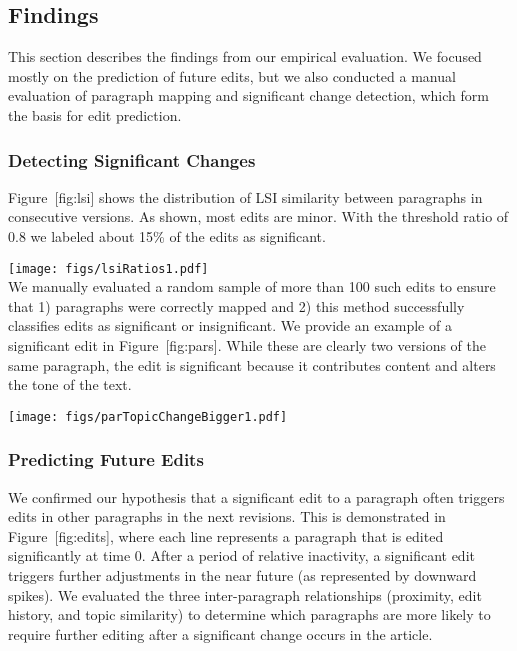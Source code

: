 \subsection{Findings}\label{findings}

This section describes the findings from our empirical evaluation. We
focused mostly on the prediction of future edits, but we also conducted
a manual evaluation of paragraph mapping and significant change
detection, which form the basis for edit prediction.

\subsubsection{Detecting Significant
Changes}\label{detecting-significant-changes}

Figure~{[}fig:lsi{]} shows the distribution of LSI similarity between
paragraphs in consecutive versions. As shown, most edits are minor. With
the threshold ratio of 0.8 we labeled about 15\% of the edits as
significant.

\texttt{[image: figs/lsiRatios1.pdf]}\\

We manually evaluated a random sample of more than 100 such edits to
ensure that 1) paragraphs were correctly mapped and 2) this method
successfully classifies edits as significant or insignificant. We
provide an example of a significant edit in Figure~{[}fig:pars{]}. While
these are clearly two versions of the same paragraph, the edit is
significant because it contributes content and alters the tone of the
text.

\texttt{[image: figs/parTopicChangeBigger1.pdf]}\\

\subsubsection{Predicting Future Edits}\label{predicting-future-edits-1}

We confirmed our hypothesis that a significant edit to a paragraph often
triggers edits in other paragraphs in the next revisions. This is
demonstrated in Figure~{[}fig:edits{]}, where each line represents a
paragraph that is edited significantly at time 0. After a period of
relative inactivity, a significant edit triggers further adjustments in
the near future (as represented by downward spikes). We evaluated the
three inter-paragraph relationships (proximity, edit history, and topic
similarity) to determine which paragraphs are more likely to require
further editing after a significant change occurs in the article.

